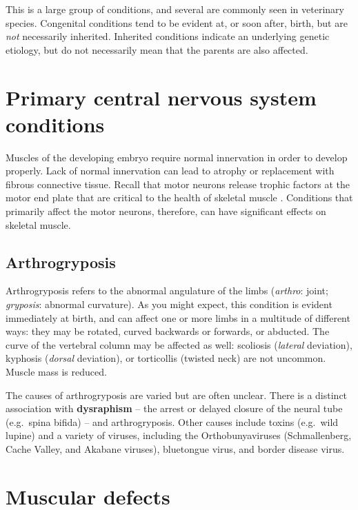 \documentclass[openany]{report}
\begin{document}
This is a large group of conditions, and several are commonly seen in
veterinary species. Congenital conditions tend to be evident at, or soon
after, birth, but are \emph{not} necessarily inherited. Inherited
conditions indicate an underlying genetic etiology, but do not
necessarily mean that the parents are also affected.

\section{Primary central nervous system
conditions}\label{primary-central-nervous-system-conditions}

Muscles of the developing embryo require normal innervation in order to
develop properly. Lack of normal innervation can lead to atrophy or
replacement with fibrous connective tissue. Recall that motor neurons
release trophic factors at the motor end plate that are critical to the
health of skeletal muscle . Conditions that primarily affect the motor
neurons, therefore, can have significant effects on skeletal muscle.

\subsection{Arthrogryposis}\label{arthrogryposis}

Arthrogryposis refers to the abnormal angulature of the limbs
(\emph{arthro}: joint; \emph{gryposis}: abnormal curvature). As you
might expect, this condition is evident immediately at birth, and can
affect one or more limbs in a multitude of different ways: they may be
rotated, curved backwards or forwards, or abducted. The curve of the
vertebral column may be affected as well: scoliosis (\emph{lateral}
deviation), kyphosis (\emph{dorsal} deviation), or torticollis (twisted
neck) are not uncommon. Muscle mass is reduced.

The causes of arthrogryposis are varied but are often unclear. There is
a distinct association with \textbf{dysraphism} -- the arrest or delayed
closure of the neural tube (e.g.~spina bifida) -- and arthrogryposis.
Other causes include toxins (e.g.~wild lupine) and a variety of viruses,
including the Orthobunyaviruses (Schmallenberg, Cache Valley, and
Akabane viruses), bluetongue virus, and border disease virus.

\section{Muscular defects}\label{muscular-defects}
\end{document}
